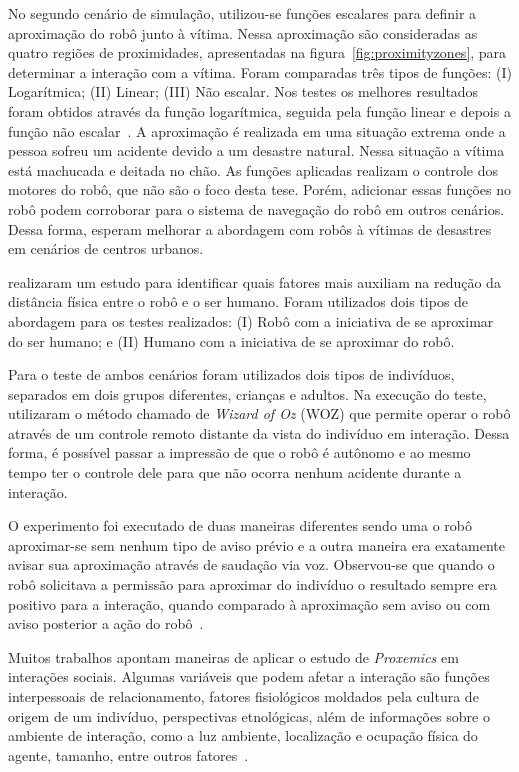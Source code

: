 No segundo cenário de simulação, utilizou-se funções escalares para definir a aproximação do robô junto à vítima. Nessa aproximação são consideradas as quatro regiões de proximidades, apresentadas na figura~\ref{fig:proximityzones}, para determinar a interação com a vítima. Foram comparadas três tipos de funções: (I) Logarítmica; (II) Linear; (III) Não escalar. Nos testes os melhores resultados foram obtidos através da função logarítmica, seguida pela função linear e depois a função não escalar~\cite{srinivasan:2012}. A aproximação é realizada em uma situação extrema onde a pessoa sofreu um acidente devido a um desastre natural. Nessa situação a vítima está machucada e deitada no chão. As funções aplicadas realizam o controle dos motores do robô, que não são o foco desta tese. Porém, adicionar essas funções no robô podem corroborar para o sistema de navegação do robô em outros cenários. Dessa forma, \textcite{srinivasan:2012} esperam melhorar a abordagem com robôs à vítimas de desastres em cenários de centros urbanos.

\textcite{okita:2012} realizaram um estudo para identificar quais fatores mais auxiliam na redução da distância física entre o robô e o ser humano. Foram utilizados dois tipos de abordagem para os testes realizados: (I) Robô com a iniciativa de se aproximar do ser humano; e (II) Humano com a iniciativa de se aproximar do robô.

Para o teste de ambos cenários foram utilizados dois tipos de indivíduos, separados em dois grupos diferentes, crianças e adultos. Na execução do teste, \textcite{okita:2012} utilizaram o método chamado de \emph{Wizard of Oz} (WOZ) que permite operar o robô através de um controle remoto distante da vista do indivíduo em interação. Dessa forma, é possível passar a impressão de que o robô é autônomo e ao mesmo tempo ter o controle dele para que não ocorra nenhum acidente durante a interação.

O experimento foi executado de duas maneiras diferentes sendo uma o robô aproximar-se sem nenhum tipo de aviso prévio e a outra maneira era exatamente avisar sua aproximação através de saudação via voz. Observou-se que quando o robô solicitava a permissão para aproximar do indivíduo o resultado sempre era positivo para a interação, quando comparado à aproximação sem aviso ou com aviso posterior a ação do robô~\cite{okita:2012}.

Muitos trabalhos apontam maneiras de aplicar o estudo de \emph{Proxemics} em interações sociais. Algumas variáveis que podem afetar a interação são funções interpessoais de relacionamento, fatores fisiológicos moldados pela cultura de origem de um indivíduo, perspectivas etnológicas, além de informações sobre o ambiente de interação, como a luz ambiente, localização e ocupação física do agente, tamanho, entre outros fatores~\cite{mead:2011b}.

